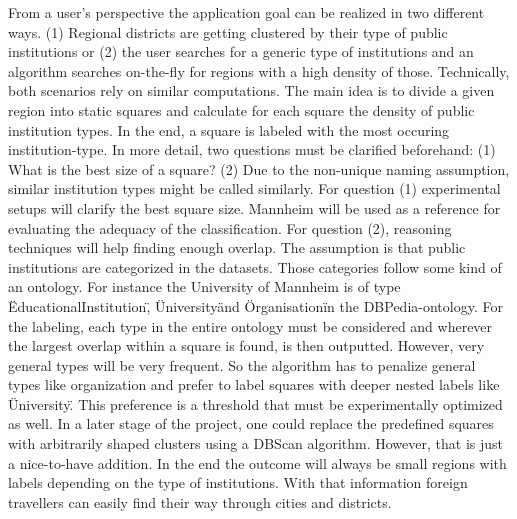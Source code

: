 From a user's perspective the application goal can be realized in two different ways. (1) Regional districts are getting clustered by their type of public institutions or (2) the user searches for a generic type of institutions and an algorithm searches on-the-fly for regions with a high density of those. Technically, both scenarios rely on similar computations. The main idea is to divide a given region into static squares and calculate for each square the density of public institution types. In the end, a square is labeled with the most occuring institution-type. In more detail, two questions must be clarified beforehand: (1) What is the best size of a square? (2) Due to the non-unique naming assumption, similar institution types might be called similarly. For question (1) experimental setups will clarify the best square size. Mannheim will be used as a reference for evaluating the adequacy of the classification. For question (2), reasoning techniques will help finding enough overlap. The assumption is that public institutions are categorized in the datasets. Those categories follow some kind of an ontology. For instance the University of Mannheim is of type \"EducationalInstitution\", \"University\" and \"Organisation\" in the DBPedia-ontology. For the labeling, each type in the entire ontology must be considered and wherever the largest overlap within a square is found, is then outputted. However, very general types will be very frequent. So the algorithm has to penalize general types like organization and prefer to label squares with deeper nested labels like \"University\". This preference is a threshold that must be experimentally optimized as well. In a later stage of the project, one could replace the predefined squares with arbitrarily shaped clusters using a DBScan algorithm. However, that is just a nice-to-have addition. In the end the outcome will always be small regions with labels depending on the type of institutions. With that information foreign travellers can easily find their way through cities and districts. 

